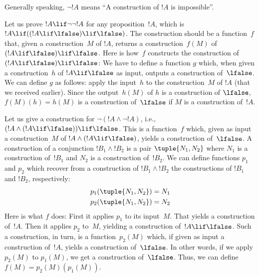 \documentclass[../../../include/open-logic-section]{subfiles}
\begin{document}
Generally speaking, $\lnot !A$ means ``A construction of $!A$ is impossible''.

\begin{ex}
Let us prove $!A \lif \lnot \lnot !A$ for any proposition~$!A$, which
is $!A \lif ((!A \lif \lfalse) \lif \lfalse)$. The construction should
be a function~$f$ that, given a construction~$M$ of $!A$, returns a
construction~$f(M)$ of $(!A \lif \lfalse) \lif \lfalse$. Here is
how~$f$ constructs the construction of $(!A \lif \lfalse) \lif
\lfalse$: We have to define a function $g$ which, when given a
construction~$h$ of $!A \lif \lfalse$ as input, outputs a construction
of~$\lfalse$. We can define $g$ as follows: apply the input~$h$ to the
construction~$M$ of $!A$ (that we received earlier). Since the
output~$h(M)$ of $h$ is a construction of $\lfalse$, $f(M)(h) = h(M)$ is a
construction of~$\lfalse$ if $M$ is a construction of~$!A$.
\end{ex}

\begin{ex}
Let us give a construction for $\lnot(!A \land \lnot !A)$, i.e., $(!A
\land (!A \lif \lfalse)) \lif \lfalse$. This is a function~$f$ which,
given as input a construction~$M$ of $!A \land (!A \lif \lfalse)$,
yields a construction of~$\lfalse$. A construction of a conjunction
$!B_1 \land !B_2$ is a pair $\tuple{N_1, N_2}$ where $N_1$ is a
construction of~$!B_1$ and $N_2$ is a construction of~$!B_2$. We can
define functions $p_1$ and $p_2$ which recover from a construction of
$!B_1 \land !B_2$ the constructions of $!B_1$ and $!B_2$, respectively:
\begin{align*}
  p_1(\tuple{N_1, N_2}) &= N_1\\
  p_2(\tuple{N_1, N_2}) &= N_2
\end{align*}
Here is what $f$ does: First it applies $p_1$ to its input~$M$. That
yields a construction of~$!A$. Then it applies $p_2$ to~$M$, yielding
a construction of~$!A \lif \lfalse$. Such a construction, in turn, is
a function~$p_2(M)$ which, if given as input a construction of~$!A$,
yields a construction of~$\lfalse$. In other words, if we apply
$p_2(M)$ to $p_1(M)$, we get a construction of~$\lfalse$.  Thus, we
can define $f(M) = p_2(M)(p_1(M))$.
\end{ex}
\end{document}

